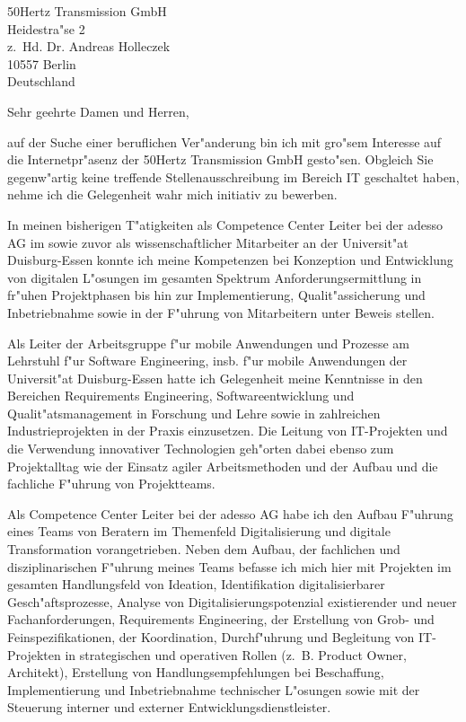 \documentclass[10pt,a4paper]{dinbrief}
\date{\today}
\begin{document}
 
\begin{letter}  
{%
	50Hertz Transmission GmbH\\
	Heidestra"se 2\\
	z.~Hd. Dr. Andreas Holleczek\\
	10557 Berlin\\
	Deutschland
}
\subject{\bf Initativbewerbung Digitalisierung und IT}
\opening{Sehr geehrte Damen und Herren,}
auf der Suche einer beruflichen Ver"anderung bin ich mit gro"sem Interesse auf die Internetpr"asenz der 50Hertz Transmission GmbH gesto"sen. Obgleich Sie gegenw"artig keine treffende Stellenausschreibung im Bereich IT geschaltet haben, nehme ich die Gelegenheit wahr mich initiativ zu bewerben. 

In meinen bisherigen T"atigkeiten als Competence Center Leiter bei der adesso AG im sowie zuvor als wissenschaftlicher Mitarbeiter an der Universit"at Duisburg-Essen konnte ich meine Kompetenzen bei Konzeption und Entwicklung von digitalen L"osungen im gesamten Spektrum Anforderungsermittlung in fr"uhen Projektphasen bis hin zur Implementierung, Qualit"assicherung und Inbetriebnahme sowie in der F"uhrung von Mitarbeitern unter Beweis stellen.

Als Leiter der Arbeitsgruppe f"ur mobile Anwendungen und Prozesse am Lehrstuhl f"ur Software Engineering, insb. f"ur mobile Anwendungen der Universit"at Duisburg-Essen hatte ich Gelegenheit meine Kenntnisse in den Bereichen Requirements Engineering, Softwareentwicklung  und Qualit"atsmanagement in Forschung und Lehre sowie in zahlreichen Industrieprojekten in der Praxis einzusetzen. Die Leitung von IT-Projekten und die Verwendung innovativer Technologien geh"orten dabei ebenso zum Projektalltag wie der Einsatz agiler Arbeitsmethoden und der Aufbau und die fachliche  F"uhrung von Projektteams.

Als Competence Center Leiter bei der adesso AG habe ich den Aufbau F"uhrung eines Teams von Beratern im Themenfeld Digitalisierung und digitale Transformation vorangetrieben. Neben dem Aufbau, der fachlichen und disziplinarischen F"uhrung meines Teams befasse ich mich hier mit Projekten im gesamten Handlungsfeld von Ideation, Identifikation digitalisierbarer Gesch"aftsprozesse, Analyse von Digitalisierungspotenzial existierender und neuer Fachanforderungen, Requirements Engineering, der Erstellung von Grob- und Feinspezifikationen, der Koordination, Durchf"uhrung und Begleitung von IT-Projekten in strategischen und operativen Rollen (z.~B. Product Owner, Architekt), Erstellung von Handlungsempfehlungen bei Beschaffung, Implementierung und Inbetriebnahme technischer L"osungen sowie mit der Steuerung interner und externer Entwicklungsdienstleister.\clearpage


\end{letter}
\end{document}
